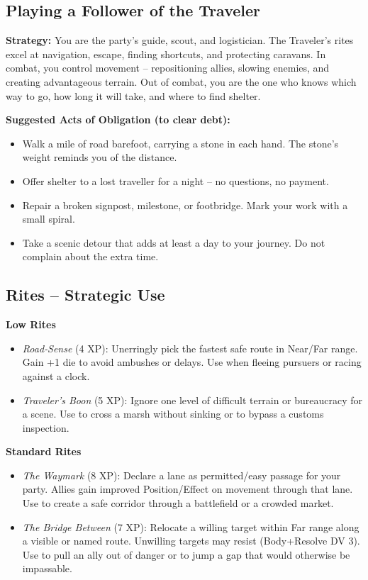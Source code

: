 \documentclass[10pt,a5paper]{book}
\begin{document}
\subsection*{Playing a Follower of the Traveler}

\textbf{Strategy:} You are the party’s guide, scout, and logistician. The Traveler’s rites excel at navigation, escape, finding shortcuts, and protecting caravans. In combat, you control movement – repositioning allies, slowing enemies, and creating advantageous terrain. Out of combat, you are the one who knows which way to go, how long it will take, and where to find shelter.

\textbf{Suggested Acts of Obligation (to clear debt):}
\begin{itemize}
    \item Walk a mile of road barefoot, carrying a stone in each hand. The stone’s weight reminds you of the distance.
    \item Offer shelter to a lost traveller for a night – no questions, no payment.
    \item Repair a broken signpost, milestone, or footbridge. Mark your work with a small spiral.
    \item Take a scenic detour that adds at least a day to your journey. Do not complain about the extra time.
\end{itemize}

\subsection*{Rites – Strategic Use}

\textbf{Low Rites}
\begin{itemize}
    \item \textit{Road‑Sense} (4 XP): Unerringly pick the fastest safe route in Near/Far range. Gain +1 die to avoid ambushes or delays. Use when fleeing pursuers or racing against a clock.
    \item \textit{Traveler’s Boon} (5 XP): Ignore one level of difficult terrain or bureaucracy for a scene. Use to cross a marsh without sinking or to bypass a customs inspection.
\end{itemize}

\textbf{Standard Rites}
\begin{itemize}
    \item \textit{The Waymark} (8 XP): Declare a lane as permitted/easy passage for your party. Allies gain improved Position/Effect on movement through that lane. Use to create a safe corridor through a battlefield or a crowded market.
    \item \textit{The Bridge Between} (7 XP): Relocate a willing target within Far range along a visible or named route. Unwilling targets may resist (Body+Resolve DV 3). Use to pull an ally out of danger or to jump a gap that would otherwise be impassable.
\end{itemize}
\end{document}

